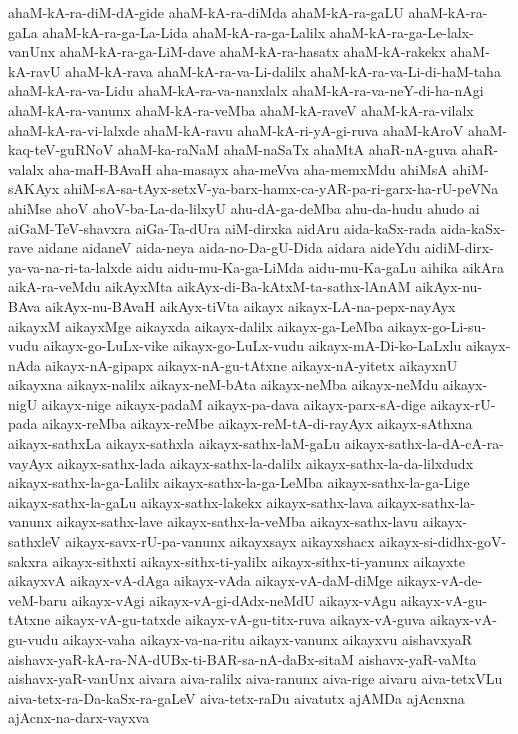 {ahaM-kA-ra-diM-dA-gide
ahaM-kA-ra-diMda
ahaM-kA-ra-gaLU
ahaM-kA-ra-gaLa
ahaM-kA-ra-ga-La-Lida
ahaM-kA-ra-ga-Lalilx
ahaM-kA-ra-ga-Le-lalx-vanUnx
ahaM-kA-ra-ga-LiM-dave
ahaM-kA-ra-hasatx
ahaM-kA-rakekx
ahaM-kA-ravU
ahaM-kA-rava
ahaM-kA-ra-va-Li-dalilx
ahaM-kA-ra-va-Li-di-haM-taha
ahaM-kA-ra-va-Lidu
ahaM-kA-ra-va-nanxlalx
ahaM-kA-ra-va-neY-di-ha-nAgi
ahaM-kA-ra-vanunx
ahaM-kA-ra-veMba
ahaM-kA-raveV
ahaM-kA-ra-vilalx
ahaM-kA-ra-vi-lalxde
ahaM-kA-ravu
ahaM-kA-ri-yA-gi-ruva
ahaM-kAroV
ahaM-kaq-teV-guRNoV
ahaM-ka-raNaM
ahaM-naSaTx
ahaMtA
ahaR-nA-guva
ahaR-valalx
aha-maH-BAvaH
aha-masayx
aha-meVva
aha-memxMdu
ahiMsA
ahiM-sAKAyx
ahiM-sA-sa-tAyx-setxV-ya-barx-hamx-ca-yAR-pa-ri-garx-ha-rU-peVNa
ahiMse
ahoV
ahoV-ba-La-da-lilxyU
ahu-dA-ga-deMba
ahu-da-hudu
ahudo
ai
aiGaM-TeV-shavxra
aiGa-Ta-dUra
aiM-dirxka
aidAru
aida-kaSx-rada
aida-kaSx-rave
aidane
aidaneV
aida-neya
aida-no-Da-gU-Dida
aidara
aideYdu
aidiM-dirx-ya-va-na-ri-ta-lalxde
aidu
aidu-mu-Ka-ga-LiMda
aidu-mu-Ka-gaLu
aihika
aikAra
aikA-ra-veMdu
aikAyxMta
aikAyx-di-Ba-kAtxM-ta-sathx-lAnAM
aikAyx-nu-BAva
aikAyx-nu-BAvaH
aikAyx-tiVta
aikayx
aikayx-LA-na-pepx-nayAyx
aikayxM
aikayxMge
aikayxda
aikayx-dalilx
aikayx-ga-LeMba
aikayx-go-Li-su-vudu
aikayx-go-LuLx-vike
aikayx-go-LuLx-vudu
aikayx-mA-Di-ko-LaLxlu
aikayx-nAda
aikayx-nA-gipapx
aikayx-nA-gu-tAtxne
aikayx-nA-yitetx
aikayxnU
aikayxna
aikayx-nalilx
aikayx-neM-bAta
aikayx-neMba
aikayx-neMdu
aikayx-nigU
aikayx-nige
aikayx-padaM
aikayx-pa-dava
aikayx-parx-sA-dige
aikayx-rU-pada
aikayx-reMba
aikayx-reMbe
aikayx-reM-tA-di-rayAyx
aikayx-sAthxna
aikayx-sathxLa
aikayx-sathxla
aikayx-sathx-laM-gaLu
aikayx-sathx-la-dA-cA-ra-vayAyx
aikayx-sathx-lada
aikayx-sathx-la-dalilx
aikayx-sathx-la-da-lilxdudx
aikayx-sathx-la-ga-Lalilx
aikayx-sathx-la-ga-LeMba
aikayx-sathx-la-ga-Lige
aikayx-sathx-la-gaLu
aikayx-sathx-lakekx
aikayx-sathx-lava
aikayx-sathx-la-vanunx
aikayx-sathx-lave
aikayx-sathx-la-veMba
aikayx-sathx-lavu
aikayx-sathxleV
aikayx-savx-rU-pa-vanunx
aikayxsayx
aikayxshacx
aikayx-si-didhx-goV-sakxra
aikayx-sithxti
aikayx-sithx-ti-yalilx
aikayx-sithx-ti-yanunx
aikayxte
aikayxvA
aikayx-vA-dAga
aikayx-vAda
aikayx-vA-daM-diMge
aikayx-vA-de-veM-baru
aikayx-vAgi
aikayx-vA-gi-dAdx-neMdU
aikayx-vAgu
aikayx-vA-gu-tAtxne
aikayx-vA-gu-tatxde
aikayx-vA-gu-titx-ruva
aikayx-vA-guva
aikayx-vA-gu-vudu
aikayx-vaha
aikayx-va-na-ritu
aikayx-vanunx
aikayxvu
aishavxyaR
aishavx-yaR-kA-ra-NA-dUBx-ti-BAR-sa-nA-daBx-sitaM
aishavx-yaR-vaMta
aishavx-yaR-vanUnx
aivara
aiva-ralilx
aiva-ranunx
aiva-rige
aivaru
aiva-tetxVLu
aiva-tetx-ra-Da-kaSx-ra-gaLeV
aiva-tetx-raDu
aivatutx
ajAMDa
ajAcnxna
ajAcnx-na-darx-vayxva
}
